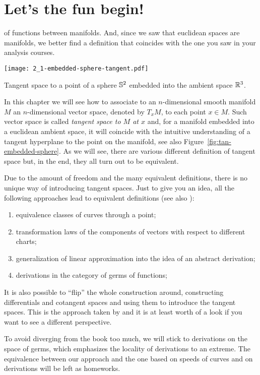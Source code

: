 \section{Let's the fun begin!}
 of functions between manifolds.
And, since we saw that euclidean spaces are manifolds, we better find a definition that coincides with the one you saw in your analysis courses.

\begin{marginfigure}[7em]
  \texttt{[image: 2\_1-embedded-sphere-tangent.pdf]}
  \label{fig:tan-embedded-sphere}
  \caption{Tangent space to a point of a sphere $\mathbb{S}^2$ embedded into the ambient space $\mathbb{R}^3$.}
\end{marginfigure}
In this chapter we will see how to associate to an $n$-dimensional smooth manifold $M$ an $n$-dimensional vector space, denoted by $T_x M$, to each point $x\in M$.
Such vector space is called \emph{tangent space to $M$ at $x$} and, for a manifold embedded into a euclidean ambient space, it will coincide with the intuitive understanding of a tangent hyperplane to the point on the manifold, see also Figure~\ref{fig:tan-embedded-sphere}.
As we will see, there are various different definition of tangent space but, in the end, they all turn out to be equivalent.

Due to the amount of freedom and the many equivalent definitions, there is no unique way of introducing tangent spaces.
Just to give you an idea, all the following approaches lead to equivalent definitions (see also \cite{book:lee}):
\begin{enumerate}
  \item equivalence classes of curves through a point;
  \item transformation laws of the components of vectors with respect to different charts;
  \item generalization of linear approximation into the idea of an abstract derivation;
  \item derivations in the category of germs of functions;
\end{enumerate}

It is also possible to ``flip'' the whole construction around, constructing differentials and cotangent spaces and using them to introduce the tangent spaces.
This is the approach taken by \cite{lectures:hitchin} and it is at least worth of a look if you want to see a different perspective.

To avoid diverging from the book too much, we will stick to derivations on the space of germs, which emphasizes the locality of derivations to an extreme.
The equivalence between our approach and the one based on speeds of curves and on derivations will be left as homeworks.

